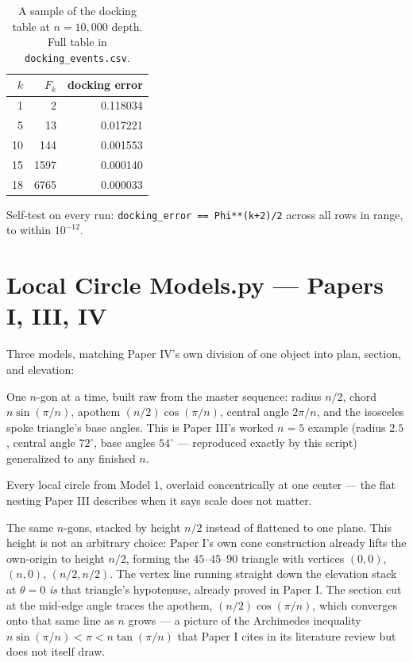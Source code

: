 \documentclass[10pt,a4paper]{article}
\newcommand{\code}[1]{\texttt{#1}}
\begin{document}
\begin{table}[h]
\centering
\small
\begin{tabular}{@{}rrr@{}}
\toprule
$k$ & $F_k$ & docking error \\
\midrule
1 & 2 & 0.118034 \\
5 & 13 & 0.017221 \\
10 & 144 & 0.001553 \\
15 & 1597 & 0.000140 \\
18 & 6765 & 0.000033 \\
\bottomrule
\end{tabular}
\caption{A sample of the docking table at $n=10{,}000$ depth. Full table
in \code{docking\_events.csv}.}
\end{table}

Self-test on every run: \code{docking\_error == Phi**(k+2)/2} across all
rows in range, to within $10^{-12}$.

\section{Local Circle Models.py --- Papers I, III, IV}

Three models, matching Paper IV's own division of one object into plan,
section, and elevation:

\begin{description}[leftmargin=1.3em]
\item[Model 1 --- local circle.] One $n$-gon at a time, built raw from
the master sequence: radius $n/2$, chord $n\sin(\pi/n)$, apothem
$(n/2)\cos(\pi/n)$, central angle $2\pi/n$, and the isosceles spoke
triangle's base angles. This is Paper III's worked $n=5$ example (radius
$2.5$, central angle $72^\circ$, base angles $54^\circ$ --- reproduced
exactly by this script) generalized to any finished $n$.
\item[Model 2 --- plan overlay.] Every local circle from Model 1,
overlaid concentrically at one center --- the flat nesting Paper III
describes when it says scale does not matter.
\item[Model 3 --- elevation stack.] The same $n$-gons, stacked by height
$n/2$ instead of flattened to one plane. This height is not an arbitrary
choice: Paper I's own cone construction already lifts the own-origin to
height $n/2$, forming the $45$--$45$--$90$ triangle with vertices
$(0,0)$, $(n,0)$, $(n/2,n/2)$. The vertex line running straight down the
elevation stack at $\theta=0$ \emph{is} that triangle's hypotenuse,
already proved in Paper I. The section cut at the mid-edge angle traces
the apothem, $(n/2)\cos(\pi/n)$, which converges onto that same line as
$n$ grows --- a picture of the Archimedes inequality
$n\sin(\pi/n) < \pi < n\tan(\pi/n)$ that Paper I cites in its literature
review but does not itself draw.
\end{description}
\end{document}
